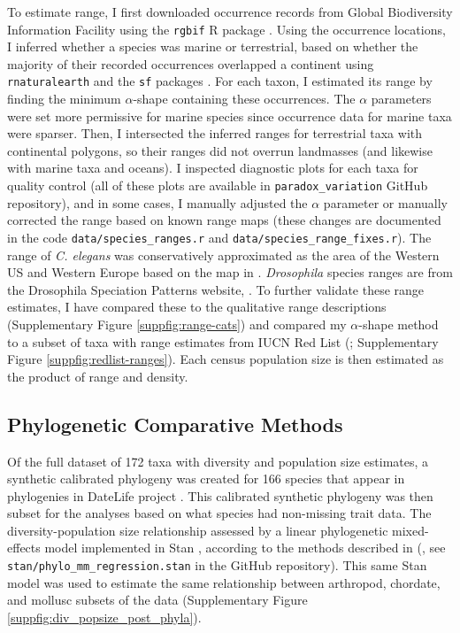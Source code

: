 \documentclass[11pt]{article}
\begin{document}
To estimate range, I first downloaded occurrence records from Global
Biodiversity Information Facility \parencite{noauthor_2020-ey} using the
\texttt{rgbif} R package \parencite{Chamberlain2014-up,Chamberlain2017-uz}.
Using the occurrence locations, I inferred whether a species was marine or
terrestrial, based on whether the majority of their recorded occurrences
overlapped a continent using \texttt{rnaturalearth} and the \texttt{sf}
packages \parencite{South2017-db,Pebesma2018-bs}. For each taxon, I estimated
its range by finding the minimum $\alpha$-shape containing these occurrences.
The $\alpha$ parameters were set more permissive for marine species since
occurrence data for marine taxa were sparser. Then, I intersected the inferred
ranges for terrestrial taxa with continental polygons, so their ranges did not
overrun landmasses (and likewise with marine taxa and oceans). I inspected
diagnostic plots for each taxa for quality control (all of these plots are
available in \texttt{paradox\_variation} GitHub repository), and in some cases,
I manually adjusted the $\alpha$ parameter or manually corrected the range
based on known range maps (these changes are documented in the code
\texttt{data/species\_ranges.r} and \texttt{data/species\_range\_fixes.r}).
The range of \emph{C. elegans} was conservatively approximated as the area of
the Western US and Western Europe based on the map in \textcite{Frezal2015-iw}.
\emph{Drosophila} species ranges are from the Drosophila Speciation Patterns
website, \parencite{Yukilevich2012-vn,Yukilevich2017-jg}. To further validate
these range estimates, I have compared these to the qualitative range
descriptions \textcite{Leffler2012-zj} (Supplementary Figure
\ref{suppfig:range-cats}) and compared my $\alpha$-shape method to a subset of
taxa with range estimates from IUCN Red List
(\cite{Chamberlain2020-tv,Iucn2020-ap}; Supplementary Figure
\ref{suppfig:redlist-ranges}). Each census population size is then estimated as
the product of range and density. 

\subsection*{Phylogenetic Comparative Methods}
\label{sec:methods-pcm}

Of the full dataset of 172 taxa with diversity and population size estimates, a
synthetic calibrated phylogeny was created for 166 species that appear in
phylogenies in DateLife project \parencite{OMeara2020-ds,Sanchez-Reyes2019-io}.
This calibrated synthetic phylogeny was then subset for the analyses based on
what species had non-missing trait data. The diversity-population size
relationship assessed by a linear phylogenetic mixed-effects model implemented
in Stan \parencite{Stan_Development_Team2020-ea}, according to the methods
described in (\cite{De_Villemereuil2014-kt}, see
\texttt{stan/phylo\_mm\_regression.stan} in the GitHub repository). This same
Stan model was used to estimate the same relationship between arthropod,
chordate, and mollusc subsets of the data (Supplementary Figure
\ref{suppfig:div_popsize_post_phyla}). 
\end{document}
